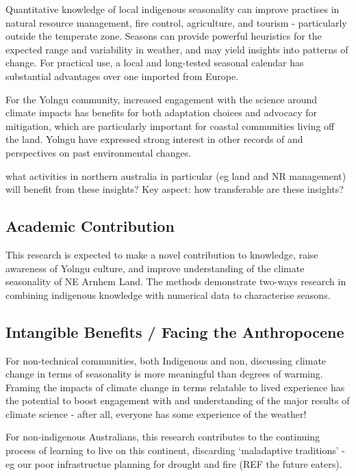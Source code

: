 Quantitative knowledge of local indigenous seasonality can improve practises in
natural resource management, fire control, agriculture, and tourism -
particularly outside the temperate zone.  Seasons can provide powerful
heuristics for the expected range and variability in weather, and may yield
insights into patterns of change.  For practical use, a local and long-tested
seasonal calendar has substantial advantages over one imported from Europe.

For the Yolngu community, increased engagement with the science around climate
impacts has benefits for both adaptation choices and advocacy for mitigation,
which are particularly important for coastal communities living off the land.
Yolngu have expressed strong interest in other records of and perspectives on
past environmental changes.

what activities in northern australia
in particular (eg land and NR management) will benefit from these insights?
Key aspect: how transferable are these insights?



\subsection{Academic Contribution}

This research is expected to make a novel contribution to knowledge, raise
awareness of Yolngu culture, and improve understanding of the climate
seasonality of NE Arnhem Land.  The methods demonstrate two-ways research in
combining indigenous knowledge with numerical data to characterise seasons.



\subsection{Intangible Benefits / Facing the Anthropocene}



For non-technical communities, both Indigenous and non, discussing climate
change in terms of seasonality is more meaningful than degrees of warming.
Framing the impacts of climate change in terms relatable to lived experience
has the potential to boost engagement with and understanding of the major
results of climate science - after all, everyone has some experience of the
weather!

For non-indigenous Australians, this research contributes to the continuing
process of learning to live on this continent, discarding `maladaptive traditions'
- eg our poor infrastructue planning for drought and fire (REF the future eaters).



